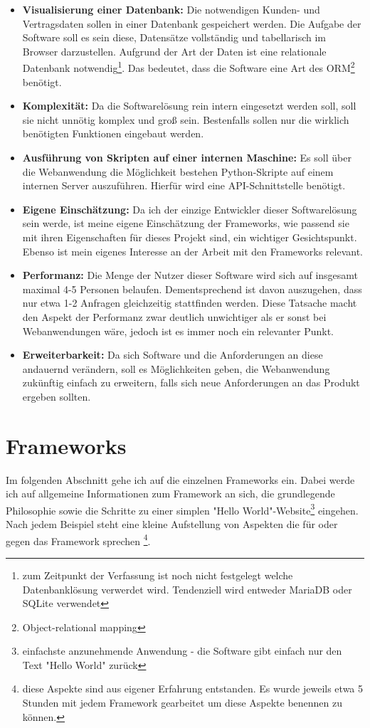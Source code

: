 \documentclass[letterpaper,11pt,leqno]{article}
\begin{document}
\begin{itemize}
	\item\textbf{Visualisierung einer Datenbank:} Die notwendigen Kunden- und Vertragsdaten sollen
	in einer Datenbank gespeichert werden. Die Aufgabe der Software soll es sein diese, Datensätze
	vollständig und tabellarisch im Browser darzustellen. Aufgrund der Art der Daten ist eine
	relationale Datenbank notwendig\footnote{zum Zeitpunkt der Verfassung ist noch nicht festgelegt
	welche Datenbanklösung verwerdet wird. Tendenziell wird entweder MariaDB oder SQLite verwendet}.
	Das bedeutet, dass die Software eine Art des ORM\footnote{Object-relational mapping} benötigt.
	\item\textbf{Komplexität:} Da die Softwarelösung rein intern eingesetzt werden soll, soll sie
	nicht unnötig komplex und groß sein. Bestenfalls sollen nur die wirklich benötigten Funktionen
	eingebaut werden.
	\item\textbf{Ausführung von Skripten auf einer internen Maschine:} Es soll über die Webanwendung
	die Möglichkeit bestehen Python-Skripte auf einem internen Server auszuführen. Hierfür wird eine
	API-Schnittstelle benötigt.
	\item\textbf{Eigene Einschätzung:} Da ich der einzige Entwickler dieser Softwarelösung sein
	werde, ist meine eigene Einschätzung der Frameworks, wie passend sie mit ihren Eigenschaften für
	dieses Projekt sind, ein wichtiger Gesichtspunkt. Ebenso ist mein eigenes Interesse an der
	Arbeit mit den Frameworks relevant.
	\item\textbf{Performanz:} Die Menge der Nutzer dieser Software wird sich auf insgesamt maximal
	4-5 Personen belaufen. Dementsprechend ist davon auszugehen, dass nur etwa 1-2 Anfragen
	gleichzeitig stattfinden werden. Diese Tatsache macht den Aspekt der Performanz zwar deutlich
	unwichtiger als er sonst bei Webanwendungen wäre, jedoch ist es immer noch ein relevanter Punkt.
	\item\textbf{Erweiterbarkeit:} Da sich Software und die Anforderungen an diese andauernd
	verändern, soll es Möglichkeiten geben, die Webanwendung zukünftig einfach zu erweitern, falls
	sich neue Anforderungen an das Produkt ergeben sollten.
\end{itemize}

\section{Frameworks}
Im folgenden Abschnitt gehe ich auf die einzelnen Frameworks ein. Dabei werde ich auf allgemeine
Informationen zum Framework an sich, die grundlegende Philosophie sowie die Schritte zu einer
simplen "Hello World"-Website\footnote{einfachste anzunehmende Anwendung - die Software gibt einfach
nur den Text "Hello World" zurück} eingehen. Nach jedem Beispiel steht eine kleine Aufstellung von
Aspekten die für oder gegen das Framework sprechen \footnote{diese Aspekte sind aus eigener
Erfahrung entstanden. Es wurde jeweils etwa 5 Stunden mit jedem Framework gearbeitet um diese
Aspekte benennen zu können.}.
\end{document}
